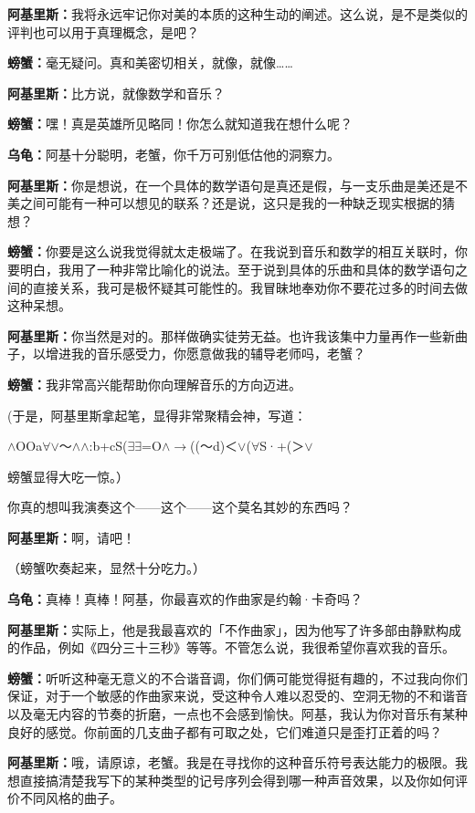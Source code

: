 \documentclass[
  12pt,
  twoside,
  openright,
  oldfontcommands,
]{memoir}
\newcommand{\dialogname}[1]{{\heifamily\bfseries #1}}
\begin{document}
\dialogname{阿基里斯：}我将永远牢记你对美的本质的这种生动的阐述。这么说，是不是类似的评判也可以用于真理概念，是吧？

\dialogname{螃蟹：}毫无疑问。真和美密切相关，就像，就像\ldots\ldots{}

\dialogname{阿基里斯：}比方说，就像数学和音乐？

\dialogname{螃蟹：}嘿！真是英雄所见略同！你怎么就知道我在想什么呢？

\dialogname{乌龟：}阿基十分聪明，老蟹，你千万可别低估他的洞察力。

\dialogname{阿基里斯：}你是想说，在一个具体的数学语句是真还是假，与一支乐曲是美还是不美之间可能有一种可以想见的联系？还是说，这只是我的一种缺乏现实根据的猜想？

\dialogname{螃蟹：}你要是这么说我觉得就太走极端了。在我说到音乐和数学的相互关联时，你要明白，我用了一种非常比喻化的说法。至于说到具体的乐曲和具体的数学语句之间的直接关系，我可是极怀疑其可能性的。我冒昧地奉劝你不要花过多的时间去做这种呆想。

\dialogname{阿基里斯：}你当然是对的。那样做确实徒劳无益。也许我该集中力量再作一些新曲子，以增进我的音乐感受力，你愿意做我的辅导老师吗，老蟹？

\dialogname{螃蟹：}我非常高兴能帮助你向理解音乐的方向迈进。

(于是，阿基里斯拿起笔，显得非常聚精会神，写道：

$\wedge$OOa$\forall$\textquotesingle$\vee$～$\wedge$$\wedge$:b+cS($\exists$$\exists$=O$\wedge$$\rightarrow$((～d)＜$\vee$($\forall$S·+(＞$\vee$

螃蟹显得大吃一惊。）

你真的想叫我演奏这个------这个------这个莫名其妙的东西吗？

\dialogname{阿基里斯：}啊，请吧！

（螃蟹吹奏起来，显然十分吃力。）

\dialogname{乌龟：}真棒！真棒！阿基，你最喜欢的作曲家是约翰·卡奇吗？

\dialogname{阿基里斯：}实际上，他是我最喜欢的「不作曲家」，因为他写了许多部由静默构成的作品，例如《四分三十三秒》等等。不管怎么说，我很希望你喜欢我的音乐。

\dialogname{螃蟹：}听听这种毫无意义的不合谐音调，你们俩可能觉得挺有趣的，不过我向你们保证，对于一个敏感的作曲家来说，受这种令人难以忍受的、空洞无物的不和谐音以及毫无内容的节奏的折磨，一点也不会感到愉快。阿基，我认为你对音乐有某种良好的感觉。你前面的几支曲子都有可取之处，它们难道只是歪打正着的吗？

\dialogname{阿基里斯：}哦，请原谅，老蟹。我是在寻找你的这种音乐符号表达能力的极限。我想直接搞清楚我写下的某种类型的记号序列会得到哪一种声音效果，以及你如何评价不同风格的曲子。
\end{document}
